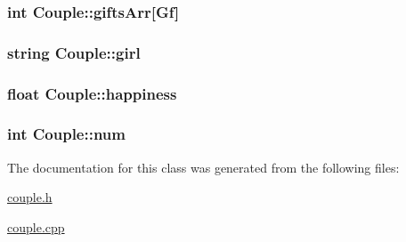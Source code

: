 \subsubsection[{\texorpdfstring{gifts\+Arr}{giftsArr}}]{\setlength{\rightskip}{0pt plus 5cm}int Couple\+::gifts\+Arr\mbox{[}{\bf Gf}\mbox{]}\hspace{0.3cm}{\ttfamily [private]}}\hypertarget{classCouple_a153dcb0b7c2cc4740b2baaad16432aee}{}\label{classCouple_a153dcb0b7c2cc4740b2baaad16432aee}
\subsubsection[{\texorpdfstring{girl}{girl}}]{\setlength{\rightskip}{0pt plus 5cm}string Couple\+::girl\hspace{0.3cm}{\ttfamily [private]}}\hypertarget{classCouple_a262cd799c80ed8da1a2a17064a01c698}{}\label{classCouple_a262cd799c80ed8da1a2a17064a01c698}
\subsubsection[{\texorpdfstring{happiness}{happiness}}]{\setlength{\rightskip}{0pt plus 5cm}float Couple\+::happiness\hspace{0.3cm}{\ttfamily [private]}}\hypertarget{classCouple_a4a874566f44bc9279c650b975799553a}{}\label{classCouple_a4a874566f44bc9279c650b975799553a}
\subsubsection[{\texorpdfstring{num}{num}}]{\setlength{\rightskip}{0pt plus 5cm}int Couple\+::num\hspace{0.3cm}{\ttfamily [private]}}\hypertarget{classCouple_aa3ac9c1d11ce38a5fb4db176f6e9565c}{}\label{classCouple_aa3ac9c1d11ce38a5fb4db176f6e9565c}


The documentation for this class was generated from the following files\+:\begin{DoxyCompactItemize}
\item 
\hyperlink{couple_8h}{couple.\+h}\item 
\hyperlink{couple_8cpp}{couple.\+cpp}\end{DoxyCompactItemize}
